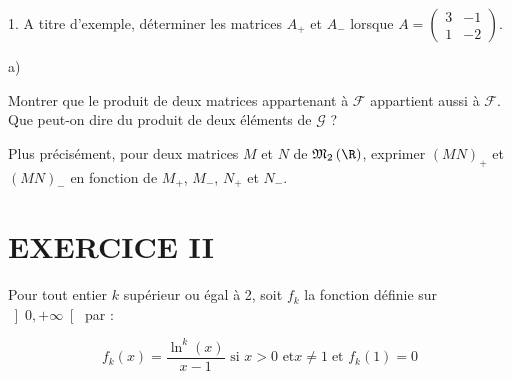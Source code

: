 \documentclass[11pt]{article}%
\begin{document}
\begin{noliste}{1.}
A titre d'exemple, déterminer les matrices $A_{+}$ et $A_{-}$ lorsque
$A = \left( 
\begin{array}{cc}
3 & -1 \\
1 & -2
\end{array}
\right) $.

\item 

\begin{noliste}{a)}
 \setlength{\itemsep}{2mm}
\item Montrer que le produit de deux matrices appartenant à
$\mathcal{F}$
appartient aussi à $\mathcal{F}$. Que peut-on dire du produit de deux
éléments de $\mathcal{G}$ ?

\item Plus précisément, pour deux matrices $M$ et $N$ de
$\mathfrak{M}_{2}\left( \R\right) $, exprimer $(MN)_{+}$ et $(MN)_{-}$
en
fonction de $M_{+}$, $M_{-}$, $N_{+}$ et $N_{-}$.
\end{noliste}
\end{noliste}

\section*{EXERCICE II}

Pour tout entier $k$ supérieur ou égal à 2, soit $f_{k}$ la fonction
définie
sur $\left] 0, + \infty \right[ $ par :

\[
f_{k}(x) = \dfrac{\ln ^{k}\left( x\right) }{x-1}\text{ si }x>0\text{ et
}x\neq
1\;\text{et }f_{k}\left( 1\right) = 0
\]
\end{document}
